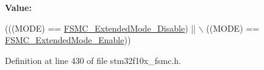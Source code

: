 {\bfseries Value\+:}
\begin{DoxyCode}
(((MODE) == \hyperlink{group___f_s_m_c___extended___mode_ga5a1f1acdc44328158f59012748980dd3}{FSMC\_ExtendedMode\_Disable}) || \(\backslash\)
                                     ((MODE) == \hyperlink{group___f_s_m_c___extended___mode_gaef9ff4c81a52fdb0471d2c4422271d2a}{FSMC\_ExtendedMode\_Enable}))
\end{DoxyCode}


Definition at line 430 of file stm32f10x\+\_\+fsmc.\+h.

